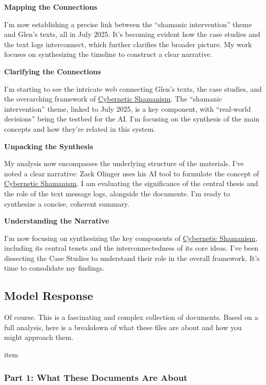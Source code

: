 \documentclass{article}
\begin{document}
\textbf{Mapping the Connections}

I'm now establishing a precise link between the ``shamanic intervention'' theme and Glen's texts, all in July 2025. It's becoming evident how the case studies and the text logs interconnect, which further clarifies the broader picture. My work focuses on synthesizing the timeline to construct a clear narrative.

\textbf{Clarifying the Connections}

I'm starting to see the intricate web connecting Glen's texts, the case studies, and the overarching framework of \hyperlink{gloss:cybernetic_shamanism}{Cybernetic Shamanism}. The ``shamanic intervention'' theme, linked to July 2025, is a key component, with ``real-world decisions'' being the testbed for the AI. I'm focusing on the synthesis of the main concepts and how they're related in this system.

\textbf{Unpacking the Synthesis}

My analysis now encompasses the underlying structure of the materials. I've noted a clear narrative: Zack Olinger uses his AI tool to formulate the concept of \hyperlink{gloss:cybernetic_shamanism}{Cybernetic Shamanism}. I am evaluating the significance of the central thesis and the role of the text message logs, alongside the documents. I'm ready to synthesize a concise, coherent summary.

\textbf{Understanding the Narrative}

I'm now focusing on synthesizing the key components of \hyperlink{gloss:cybernetic_shamanism}{Cybernetic Shamanism}, including its central tenets and the interconnectedness of its core ideas. I've been dissecting the Case Studies to understand their role in the overall framework. It's time to consolidate my findings.

\subsection*{Model Response}\label{model-response}

Of course. This is a fascinating and complex collection of documents. Based on a full analysis, here is a breakdown of what these files are about and how you might approach them.

item\subsubsection*{Part 1: What These Documents Are About} \label{part-1-what-these-documents-are-about}
\end{document}
